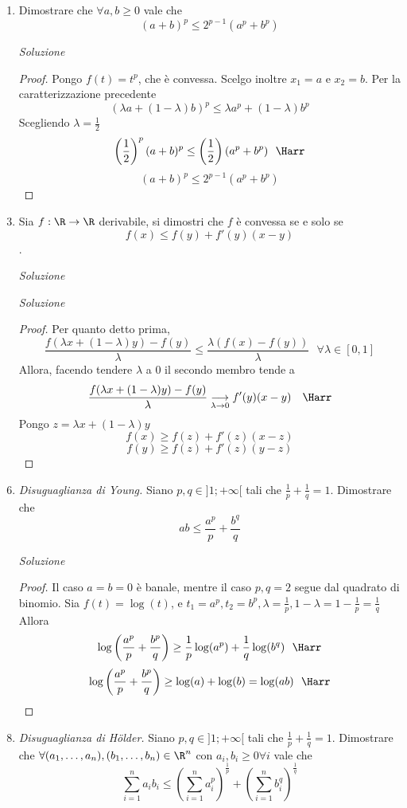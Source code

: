 \documentclass{article}
\begin{document}
\begin{enumerate}[label=\textbf{Esercizio 12.\arabic*.},itemindent=*]
\begin{proof}
    che è verificato $\forall \lambda \in [0,1]\forall x_1,x_2\in \R$.
\end{proof}
\item Dimostrare che $\forall a,b\geq 0$ vale che 
\[(a+b)^p\leq 2^{p-1}(a^p+b^p)\]
\item[\textit{\large Soluzione~}]~
\begin{proof}
    Pongo $f(t)=t^p$, che è convessa. Scelgo inoltre $x_1=a$ e $x_2=b$. Per la caratterizzazione precedente 
    \[(\lambda a +(1-\lambda)b)^p\leq \lambda a^p+(1-\lambda)b^p\]
    Scegliendo $\lambda=\frac{1}{2}$
    \[\left( \frac{1}{2} \right)^p(a+b)^p\leq \left( \frac{1}{2} \right)(a^p+b^p)~~\Harr\]\[(a+b)^p\leq 2^{p-1}(a^p+b^p)\]
\end{proof}
\item Sia $f:\R\to\R$ derivabile, si dimostri che $f$ è convessa se e solo se \[f(x)\leq f(y)+f'(y)(x-y)\].
\item[\textit{\large Soluzione~}]~\item[\textit{\large Soluzione~}]~
\begin{proof}
    Per quanto detto prima, 
    \[\frac{f(\lambda x+(1-\lambda)y)-f(y)}{\lambda}\leq \frac{\lambda (f(x)-f(y))}{\lambda}~~~\forall \lambda \in [0,1]\]
    Allora, facendo tendere $\lambda$ a $0$ il secondo membro tende a 
    \[\frac{f(\lambda x+(1-\lambda)y)-f(y)}{\lambda}\underset{\lambda \to 0}\longrightarrow f'(y)(x-y)~~~\Harr\]
    Pongo $z=\lambda x+(1-\lambda)y$
    \[f(x)\geq f(z)+f'(z)(x-z)\]
    \[f(y)\geq f(z)+f'(z)(y-z)\]
\end{proof}
\item \textit{Disuguaglianza di Young.} Siano $p, q\in ]1;+\infty[$ tali che $\frac{1}{p}+\frac{1}{q}=1$. Dimostrare che 
\[ab\leq \frac{a^p}{p}+\frac{b^q}{q}\]
\item[\textit{\large Soluzione~}]~

\begin{proof}
    Il caso $a=b=0$ è banale, mentre il caso $p,q=2$ segue dal quadrato di binomio. Sia $f(t)=\log(t)$, e $t_1=a^p, t_2=b^p, \lambda =\frac{1}{p}, 1-\lambda=1-\frac{1}{p}=\frac{1}{q}$
    Allora
    \[\log\left( \frac{a^p}{p}+\frac{b^p}{q} \right)\geq \frac{1}{p}\log(a^p)+\frac{1}{q}\log(b^q)~~\Harr\]
    \[\log\left( \frac{a^p}{p}+\frac{b^p}{q} \right)\geq \log(a)+\log(b)=\log(ab)~~\Harr\]
\end{proof}
\item \textit{Disuguaglianza di Hölder.} Siano $p, q\in ]1;+\infty[$ tali che $\frac{1}{p}+\frac{1}{q}=1$. Dimostrare che $\forall (a_1, \dots, a_n), (b_1,\dots, b_n)\in \R^n$ con $a_i, b_i\geq 0\forall i$ vale che 
\[\sum_{i=1}^n a_ib_i\leq \left(\sum_{i=1}^na_i^p\right)^{\frac{1}{p}}+\left(\sum_{i=1}^nb_i^q\right)^{\frac{1}{q}}\]


\end{enumerate}
\end{document}
